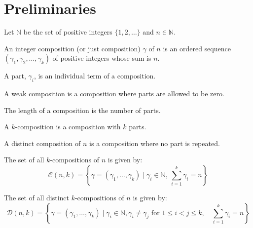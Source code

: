 \section{Preliminaries}
\label{sec:preliminaries}

Let $\mathbb{N}$ be the set of positive integers $\{1, 2, \dots\}$ and $n \in \mathbb{N}$.

\begin{definition}
    An integer composition (or just composition) $\gamma$ of $n$ is an ordered sequence $(\gamma_1, \gamma_2, \dots, \gamma_k)$ of positive integers whose sum is $n$.
\end{definition}

\begin{definition}
    A part, $\gamma_i$, is an individual term of a composition.
\end{definition}

\begin{definition}
    A weak composition is a composition where parts are allowed to be zero.
\end{definition}

\begin{definition}
    The length of a composition is the number of parts.
\end{definition}

\begin{definition}
    A $k$-composition is a composition with $k$ parts.
\end{definition}

\begin{definition}
    A distinct composition of $n$ is a composition where no part is repeated.
\end{definition}

\begin{definition}
    The set of all $k$-compositions of $n$ is given by:
    \[
        \mathcal{C}(n, k) =
            \left\{
                \gamma = (\gamma_1, \dots, \gamma_k)
                \mid
                \gamma_i \in \mathbb{N},\ \sum_{i = 1}^{k} \gamma_i = n
            \right\}
    \]
\end{definition}

\begin{definition}
    The set of all distinct $k$-compositions of $n$ is given by:
    \[
        \mathcal{D}(n, k) =
            \left\{
                \gamma = (\gamma_1, \dots, \gamma_k)
                \mid
                \gamma_i \in \mathbb{N},
                \gamma_i \neq \gamma_j \text{ for } 1 \leq i < j \leq k,
                \quad \sum_{i = 1}^{k} \gamma_i = n
            \right\}
    \]
\end{definition}

